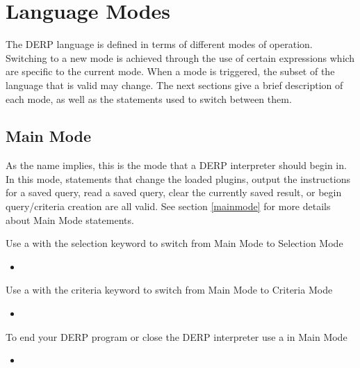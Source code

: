 \section{Language Modes}

The DERP language is defined in terms of different modes of operation.
Switching to a new mode is achieved through the use of certain expressions
which are specific to the current mode. When a mode is triggered, the
subset of the language that is valid may change. The next sections give
a brief description of each mode, as well as the statements used to switch between them.


\subsection{Main Mode}

As the name implies, this is the mode that a DERP interpreter should begin in. In this mode,
statements that change the loaded plugins, output the instructions for a saved query, read a
saved query, clear the currently saved result, or begin query/criteria creation are all valid.
See section \ref{mainmode} for more details about Main Mode statements.

Use a  with the selection keyword to switch from Main Mode to Selection Mode
\begin{itemize}[leftmargin=2in]
    \item[\nonterminal{create\_expression}] \bnf{:}    
\end{itemize}

Use a  with the criteria keyword to switch from Main Mode to Criteria Mode
\begin{itemize}[leftmargin=2in]
    \item[\nonterminal{create\_expression}] \bnf{:}    
\end{itemize}

To end your DERP program or close the DERP interpreter use a  in Main Mode
\begin{itemize}[leftmargin=2in]
    \item[\nonterminal{stop\_expression}] \bnf{:}  \bnf{|} 
\end{itemize}

